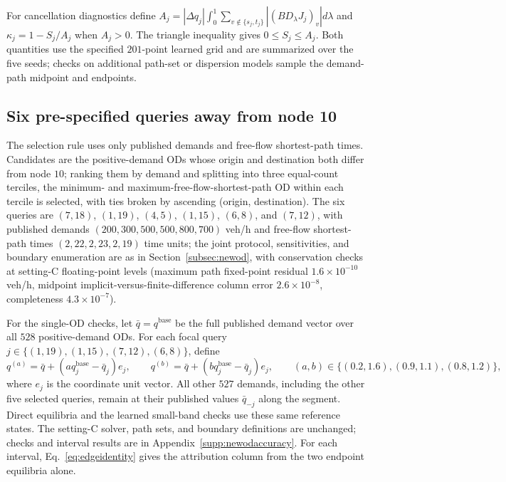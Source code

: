 For cancellation diagnostics define
$A_j=|\Delta q_j|\int_0^1\sum_{v\notin\{s_j,t_j\}}|(BD_\lambda J_j)_v|d\lambda$
and $\kappa_j=1-S_j/A_j$ when $A_j>0$. The triangle inequality gives
$0\le S_j\le A_j$. Both quantities use the specified $201$-point learned
grid and are summarized over the five seeds; checks on additional
path-set or dispersion models sample the demand-path midpoint and
endpoints.

\subsection{Six pre-specified queries away from node 10}\label{supp:newod}
The selection rule uses only published demands and free-flow
shortest-path times. Candidates are the positive-demand ODs whose origin
and destination both differ from node $10$; ranking them by demand and
splitting into three equal-count terciles, the minimum- and
maximum-free-flow-shortest-path OD within each tercile is selected, with
ties broken by ascending (origin, destination). The six queries are
$(7,18)$, $(1,19)$, $(4,5)$, $(1,15)$, $(6,8)$, and $(7,12)$, with
published demands $(200,300,500,500,800,700)$ veh/h and free-flow
shortest-path times $(2,22,2,23,2,19)$ time units; the joint
protocol, sensitivities, and boundary enumeration are as in
Section~\ref{subsec:newod}, with conservation checks at setting-C
floating-point levels (maximum path fixed-point residual
$1.6\times10^{-10}$ veh/h, midpoint implicit-versus-finite-difference
column error $2.6\times10^{-8}$, completeness $4.3\times10^{-7}$).

For the single-OD checks, let $\bar q=q^{\mathrm{base}}$ be the full
published demand vector over all $528$ positive-demand ODs. For each
focal query $j\in\{(1,19),(1,15),(7,12),(6,8)\}$, define
\begin{equation}
q^{(a)}=\bar q+(a q_j^{\mathrm{base}}-\bar q_j)e_j,
\qquad
q^{(b)}=\bar q+(b q_j^{\mathrm{base}}-\bar q_j)e_j,
\qquad
(a,b)\in\{(0.2,1.6),(0.9,1.1),(0.8,1.2)\},
\label{eq:singleodstates}
\end{equation}
where $e_j$ is the coordinate unit vector. All other $527$ demands,
including the other five selected queries, remain at their published
values $\bar q_{-j}$ along the segment. Direct equilibria and the learned
small-band checks use these same reference states. The setting-C solver,
path sets, and boundary definitions are unchanged; checks and interval
results are in Appendix~\ref{supp:newodaccuracy}. For each interval,
Eq.~\eqref{eq:edgeidentity} gives the attribution column from the two
endpoint equilibria alone.








